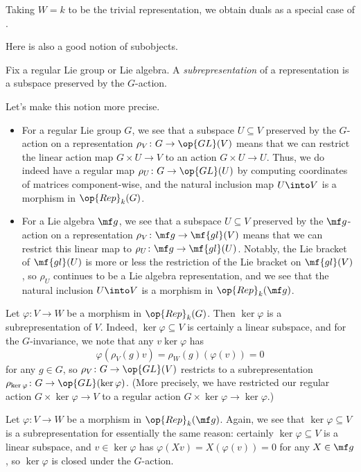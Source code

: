 \documentclass[../notes.tex]{subfiles}
\begin{document}
\begin{example}
	Taking $W=k$ to be the trivial representation, we obtain duals as a special case of .
\end{example}
Here is also a good notion of subobjects.
\begin{definition}[suprepresentation]
	Fix a regular Lie group or Lie algebra. A \textit{subrepresentation} of a representation is a subspace preserved by the $G$-action.
\end{definition}
\begin{remark}
	Let's make this notion more precise.
	\begin{itemize}
		\item For a regular Lie group $G$, we see that a subspace $U\subseteq V$ preserved by the $G$-action on a representation $\rho_V\colon G\to\op{GL}(V)$ means that we can restrict the linear action map $G\times U\to V$ to an action $G\times U\to U$. Thus, we do indeed have a regular map $\rho_U\colon G\to\op{GL}(U)$ by computing coordinates of matrices component-wise, and the natural inclusion map $U\into V$ is a morphism in $\op{Rep}_k(G)$.
		\item For a Lie algebra $\mf g$, we see that a subspace $U\subseteq V$ preserved by the $\mf g$-action on a representation $\rho_V\colon\mf g\to\mf{gl}(V)$ means that we can restrict this linear map to $\rho_U\colon\mf g\to\mf{gl}(U)$. Notably, the Lie bracket of $\mf{gl}(U)$ is more or less the restriction of the Lie bracket on $\mf{gl}(V)$, so $\rho_U$ continues to be a Lie algebra representation, and we see that the natural inclusion $U\into V$ is a morphism in $\op{Rep}_k(\mf g)$.
	\end{itemize}
\end{remark}
\begin{example}
	Let $\varphi\colon V\to W$ be a morphism in $\op{Rep}_k(G)$. Then $\ker\varphi$ is a subrepresentation of $V$. Indeed, $\ker\varphi\subseteq V$ is certainly a linear subspace, and for the $G$-invariance, we note that any $v\ker\varphi$ has
	\[\varphi(\rho_V(g)v)=\rho_W(g)(\varphi(v))=0\]
	for any $g\in G$, so $\rho_V\colon G\to\op{GL}(V)$ restricts to a subrepresentation $\rho_{\ker\varphi}\colon G\to\op{GL}(\ker\varphi)$. (More precisely, we have restricted our regular action $G\times\ker\varphi\to V$ to a regular action $G\times\ker\varphi\to\ker\varphi$.)
\end{example}
\begin{example}
	Let $\varphi\colon V\to W$ be a morphism in $\op{Rep}_k(\mf g)$. Again, we see that $\ker\varphi\subseteq V$ is a subrepresentation for essentially the same reason: certainly $\ker\varphi\subseteq V$ is a linear subspace, and $v\in\ker\varphi$ has $\varphi(Xv)=X(\varphi(v))=0$ for any $X\in\mf g$, so $\ker\varphi$ is closed under the $G$-action.
\end{example}
\end{document}

